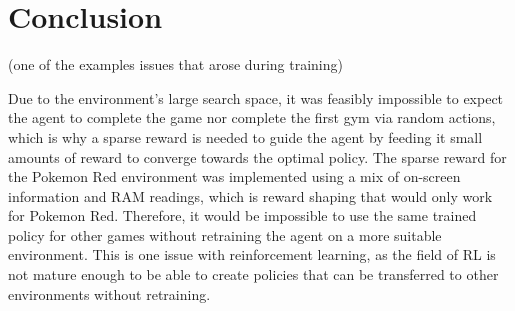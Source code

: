 \section{Conclusion}


(one of the examples issues that arose during training)

Due to the environment's large search space, it was feasibly impossible to expect the agent to complete the game nor complete the first gym via random actions, which is why a sparse reward is needed to guide the agent by feeding it small amounts of reward to converge towards the optimal policy. The sparse reward for the Pokemon Red environment was implemented using a mix of on-screen information and RAM readings, which is reward shaping that would only work for Pokemon Red. Therefore, it would be impossible to use the same trained policy for other games without retraining the agent on a more suitable environment. This is one issue with reinforcement learning, as the field of RL is not mature enough to be able to create policies that can be transferred to other environments without retraining.